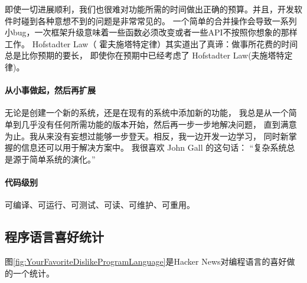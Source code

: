 \documentclass{book}
\begin{document}
即使一切进展顺利，我们也很难对功能所需的时间做出正确的预算。并且，开发软件时碰到各种意想不到的问题是非常常见的。
一个简单的合并操作会导致一系列小bug，一次框架升级意味着一些函数必须改变或者一些API不按照你想象的那样工作。
Hofstadter Law（ 霍夫施塔特定律）其实道出了真谛：做事所花费的时间总是比你预期的要长，
即使你在预期中已经考虑了 Hofstadter Law(夫施塔特定律)。

\paragraph{从小事做起，然后再扩展}

无论是创建一个新的系统，还是在现有的系统中添加新的功能，
我总是从一个简单到几乎没有任何所需功能的版本开始，然后再一步一步地解决问题，
直到满意为止。我从来没有妄想过能够一步登天。相反，我一边开发一边学习，
同时新掌握的信息还可以用于解决方案中。
我很喜欢 John Gall 的这句话：
“复杂系统总是源于简单系统的演化。”

\paragraph{代码级别}

可编译、可运行、可测试、可读、可维护、可重用。

\subsection{程序语言喜好统计}

图\ref{fig:YourFavoriteDislikeProgramLanguage}是Hacker News对编程语言的喜好做的一个统计。
\end{document}
